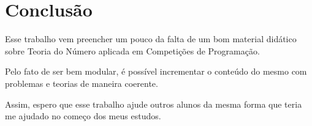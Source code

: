 
\chapter{Conclusão} %

\label{Chapter5} %


Esse trabalho vem preencher um pouco da falta de um bom material didático sobre Teoria do Número aplicada em Competições de Programação.

Pelo fato de ser bem modular, é possível incrementar o conteúdo do mesmo com problemas e teorias de maneira coerente.

Assim, espero que esse trabalho ajude outros alunos da mesma forma que teria me ajudado no começo dos meus estudos. 
